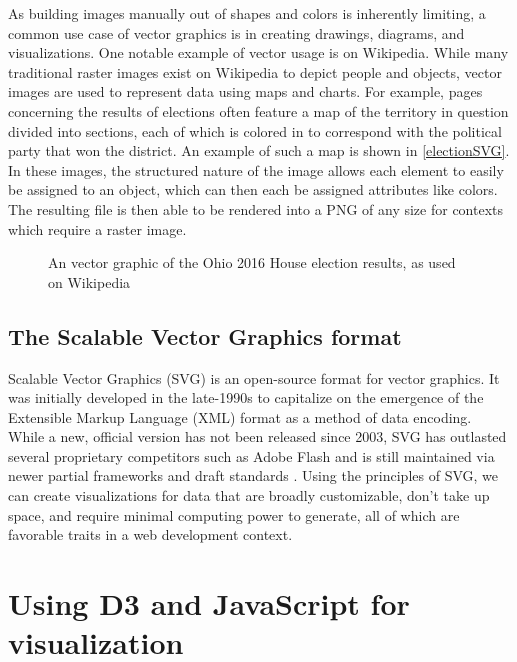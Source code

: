 As building images manually out of shapes and colors is inherently limiting, a common use case of vector graphics is in creating drawings, diagrams, and visualizations. One notable example of vector usage is on Wikipedia. While many traditional raster images exist on Wikipedia to depict people and objects, vector images are used to represent data using maps and charts. For example, pages concerning the results of elections often feature a map of the territory in question divided into sections, each of which is colored in to correspond with the political party that won the district. An example of such a map is shown in \autoref{electionSVG}. In these images, the structured nature of the image allows each element to easily be assigned to an object, which can then each be assigned attributes like colors. The resulting file is then able to be rendered into a PNG of any size for contexts which require a raster image.

\begin{figure}[!ht]
	\begin{center}
		\caption{An vector graphic of the Ohio 2016 House election results, as used on Wikipedia\cite{noauthor_2016_2025}}\label{electionSVG}
	\end{center}
\end{figure}

\subsection{The Scalable Vector Graphics format}

Scalable Vector Graphics (SVG) is an open-source format for vector graphics. It was initially developed in the late-1990s to capitalize on the emergence of the Extensible Markup Language (XML) format as a method of data encoding. While a new, official version has not been released since 2003, SVG has outlasted several proprietary competitors such as Adobe Flash and is still maintained via newer partial frameworks and draft standards \cite{kirsanov_book_2021}. Using the principles of SVG, we can create visualizations for data that are broadly customizable, don't take up space, and require minimal computing power to generate, all of which are favorable traits in a web development context. 

\section{Using D3 and JavaScript for visualization}

